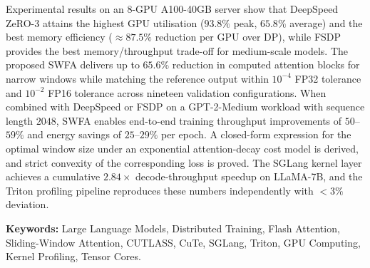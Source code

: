 Experimental results on an 8-GPU A100-40GB server show that DeepSpeed ZeRO-3
attains the highest GPU utilisation ($93.8\%$ peak, $65.8\%$ average) and the
best memory efficiency ($\approx 87.5\%$ reduction per GPU over DP), while
FSDP provides the best memory/throughput trade-off for medium-scale models.
The proposed SWFA delivers up to $65.6\%$ reduction in computed attention
blocks for narrow windows while matching the reference output within
$10^{-4}$ FP32 tolerance and $10^{-2}$ FP16 tolerance across nineteen
validation configurations. When combined with DeepSpeed or FSDP on a
GPT-2-Medium workload with sequence length $2048$, SWFA enables end-to-end
training throughput improvements of $50$--$59\%$ and energy savings of
$25$--$29\%$ per epoch. A closed-form expression for the optimal window
size under an exponential attention-decay cost model is derived, and strict
convexity of the corresponding loss is proved. The SGLang kernel layer
achieves a cumulative $2.84\times$ decode-throughput speedup on LLaMA-7B,
and the Triton profiling pipeline reproduces these numbers independently
with $<\!3\%$ deviation.

\vspace{4mm}
\noindent\textbf{Keywords:} Large Language Models, Distributed Training,
Flash Attention, Sliding-Window Attention, CUTLASS, CuTe, SGLang,
Triton, GPU Computing, Kernel Profiling, Tensor Cores.
